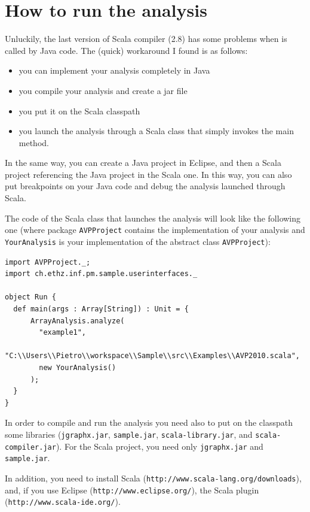 \documentclass[11pt]{article}
\newcommand{\statement}[1]{\lstinline{#1}}
\begin{document}
\section{How to run the analysis}
Unluckily, the last version of Scala compiler (2.8) has some problems when is called by Java code. The (quick) workaround I found is as follows:
\begin{itemize}
\item you can implement your analysis completely in Java
\item you compile your analysis and create a jar file
\item you put it on the Scala classpath
\item you launch the analysis through a Scala class that simply invokes the main method.
\end{itemize}
In the same way, you can create a Java project in Eclipse, and then a Scala project referencing the Java project in the Scala one. In this way, you can also put breakpoints on your Java code and debug the analysis launched through Scala.

The code of the Scala class that launches the analysis will look like the following one (where package \statement{AVPProject} contains the implementation of your analysis and \statement{YourAnalysis} is your implementation of the abstract class \statement{AVPProject}):

\begin{lstlisting}
import AVPProject._;
import ch.ethz.inf.pm.sample.userinterfaces._

object Run {
  def main(args : Array[String]) : Unit = {
	  ArrayAnalysis.analyze(
		"example1",
		"C:\\Users\\Pietro\\workspace\\Sample\\src\\Examples\\AVP2010.scala",
		new YourAnalysis()
	  );
  }
}
\end{lstlisting}

In order to compile and run the analysis you need also to put on the classpath some libraries (\statement{jgraphx.jar}, \statement{sample.jar}, \statement{scala-library.jar}, and \statement{scala-compiler.jar}). For the Scala project, you need only \statement{jgraphx.jar} and \statement{sample.jar}.

In addition, you need to install Scala (\texttt{http://www.scala-lang.org/downloads}), and, if you use Eclipse (\texttt{http://www.eclipse.org/}), the Scala plugin (\texttt{http://www.scala-ide.org/}).
\end{document}
